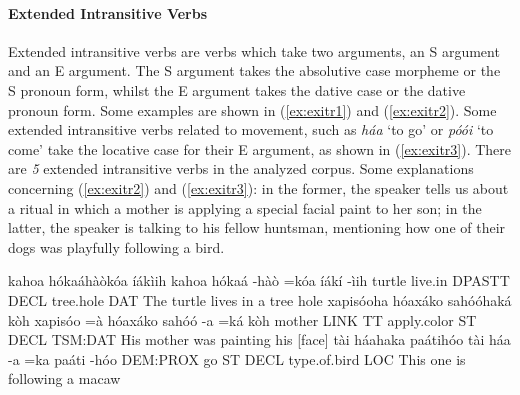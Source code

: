 \documentclass[a4paper, 12pt, oneside]{memoir}
\newcommand{\emh}[1]{\textit{#1}}
\begin{document}
\paragraph{Extended Intransitive Verbs}
Extended intransitive verbs are verbs which take two arguments, an S argument and an E argument. The S argument takes the absolutive case morpheme or the S pronoun form, whilst the E argument takes the dative case or the dative pronoun form. Some examples are shown in (\ref{ex:exitr1}) and (\ref{ex:exitr2}). Some extended intransitive verbs related to movement, such as \emh{háa} `to go' or \emh{póói} `to come' take the locative case for their E argument, as shown in (\ref{ex:exitr3}). There are \textit{5} extended intransitive verbs in the analyzed corpus. Some explanations concerning (\ref{ex:exitr2}) and (\ref{ex:exitr3}): in the former, the speaker tells us about a ritual in which a mother is applying a special facial paint to her son; in the latter, the speaker is talking to his fellow huntsman, mentioning how one of their dogs was playfully following a bird.
\begin{examples}
    \ex \label{ex:exitr1} 
    \words kahoa hókaáhàòkóa íákìih
    \bits kahoa hókaá -hàò =kóa íákí -ìih 
    \gloss turtle live.in DPASTT DECL tree.hole DAT
    \tr The turtle lives in a tree hole
    \ex \label{ex:exitr2}
    \words xapisóoha hóaxáko sahóóhaká kòh
    \bits xapisóo =à hóaxáko sahóó -a =ká kòh
    \gloss mother LINK TT apply.color ST DECL TSM:DAT
    \tr His mother was painting his [face]
    \ex \label{ex:exitr3}
    \words tài háahaka paátihóo
    \bits  tài háa -a =ka paáti -hóo 
    \gloss DEM:PROX go ST DECL type.of.bird LOC
    \tr This one is following a macaw
\end{examples}
\end{document}

